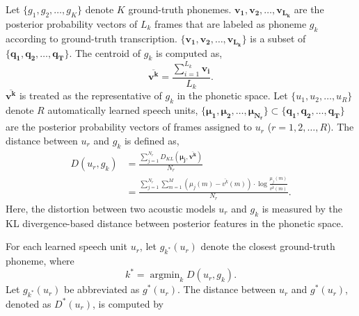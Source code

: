 \documentclass[a4paper]{article}
\begin{document}
Let $\{g_1, g_2, \ldots, g_K\}$ denote $K$ ground-truth phonemes. $\bm{v_{1}}, \bm{v_{2}}, \ldots, \bm{v_{L_k}}$ are the posterior probability vectors of $L_k$ frames that are labeled as phoneme $g_k$ according to ground-truth transcription. $\{\bm{v_{1}}, \bm{v_{2}}, \ldots, \bm{v_{L_k}}\}$ is a subset of $\{\bm{q_1}, \bm{q_2}, \ldots, \bm{q_T}\}$.
The centroid of $g_k$ is computed as,
\begin{equation}
  \bm{\overline{v^{k}}} = \frac{\sum\limits_{i=1}^{L_k}\bm{v_{i}}}{L_k}.
  \label{centroid vector of g_k}
\end{equation}
$\bm{\overline{v^k}}$ is treated as the representative of $g_k$ in the phonetic space. 
Let $\{u_1, u_2, \ldots, u_R\}$ denote $R$ automatically learned speech units, $\{\bm{\mu_{1}}, \bm{\mu_{2}}, \ldots, \bm{\mu_{N_r}}\} \subset \{  \bm{q_1}, \bm{q_2}, \ldots, \bm{q_T} \}$ are the posterior probability vectors of frames assigned to $u_r$ ($r=1, 2, \ldots, R$). The distance between $u_r$ and $g_k$ is defined as,
\begin{align}
D (u_r, g_k) &= \frac{\sum\limits_{j=1}^{N_r} D_{KL} (\bm{\mu_{j}}, \bm{\overline{v^k}} ) }{N_r}  \label{distancedef1}\\
 &= \frac{\sum\limits_{j=1}^{N_r}  \sum\limits_{m=1}^{M} (\mu_{j} (m) -  {\overline{v^k}} (m)  )\cdot \log \frac{\mu_{j} (m)}{{\overline{v^k}}(m)} }{N_r}. \label{distancedef2}
\end{align}
Here, the distortion between two acoustic models $u_r$ and $g_k$ is measured by the KL divergence-based distance between posterior features in the phonetic space.

For each learned speech unit $u_r$, let $g_{k^{*}} (u_r)$ denote the closest ground-truth phoneme, where
\begin{equation}
k^* = \mathop{\arg\min}_{k} D(u_r, g_k). \label{optimal k}
\end{equation}
Let $g_{k^*} (u_r)$ be abbreviated as $g^* (u_r)$. The distance between $u_r$ and $g^* (u_r)$, denoted as $D^* (u_r)$, is computed by
\end{document}
